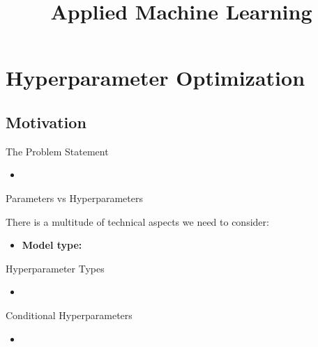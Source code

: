 \documentclass[11pt,compress,t,notes=noshow, aspectratio=169, xcolor=table]{beamer}
\title{Applied Machine Learning}
\date{}
\begin{document}
\newcommand{\titlefigure}{figure/performance_vs_interpretability}
\newcommand{\learninggoals}{
\item The Hyperparameter Optimization Problem
\item Grid Search, Random Search and Bayesian optimization
\item Separation of Train and Test}


\section{Hyperparameter Optimization}
\subsection{Motivation}



\begin{frame}{The Problem Statement}
\begin{itemize}
\setlength\itemsep{1em}
    \item 
\end{itemize}
    
\end{frame}
\begin{frame}{Parameters vs Hyperparameters}

There is a multitude of technical aspects we need to consider:
\vspace{1em}
\begin{itemize}
\setlength\itemsep{1em}
    \item \textbf{Model type:} 
\end{itemize}
\end{frame}

\begin{frame}{Hyperparameter Types}

\begin{itemize}
\setlength\itemsep{2em}
    \item 
\end{itemize}
\end{frame}

\begin{frame}{Conditional Hyperparameters}

\begin{itemize}
\setlength\itemsep{2em}
    \item 
\end{itemize}
\end{frame}
\end{document}
